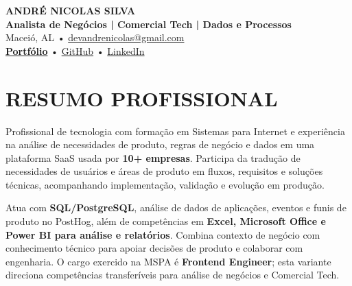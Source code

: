 \documentclass[10pt,a4paper]{article}
\begin{document}

\begin{center}

    {\LARGE \textbf{ANDRÉ NICOLAS SILVA}} \\[-2pt]

    {\normalsize \textbf{Analista de Negócios | Comercial Tech | Dados e Processos}} \\[1pt]

    \footnotesize
    Maceió, AL \quad • \quad
    \href{mailto:devandrenicolas@gmail.com}{devandrenicolas@gmail.com} \\[-1pt]

    \textbf{\href{https://portfolio-andrenicolas.vercel.app}{Portfólio}}
    \quad • \quad
    \href{https://github.com/devAndreNicolas}{GitHub}
    \quad • \quad
    \href{https://www.linkedin.com/in/devandrenicolas}{LinkedIn}

\end{center}

\vspace{-3pt}


\section*{RESUMO PROFISSIONAL}

\footnotesize

Profissional de tecnologia com formação em Sistemas para Internet e experiência na análise de necessidades de produto, regras de negócio e dados em uma plataforma SaaS usada por \textbf{10+ empresas}. Participa da tradução de necessidades de usuários e áreas de produto em fluxos, requisitos e soluções técnicas, acompanhando implementação, validação e evolução em produção.

Atua com \textbf{SQL/PostgreSQL}, análise de dados de aplicações, eventos e funis de produto no PostHog, além de competências em \textbf{Excel, Microsoft Office e Power BI para análise e relatórios}. Combina contexto de negócio com conhecimento técnico para apoiar decisões de produto e colaborar com engenharia. O cargo exercido na MSPA é \textbf{Frontend Engineer}; esta variante direciona competências transferíveis para análise de negócios e Comercial Tech.
\end{document}
